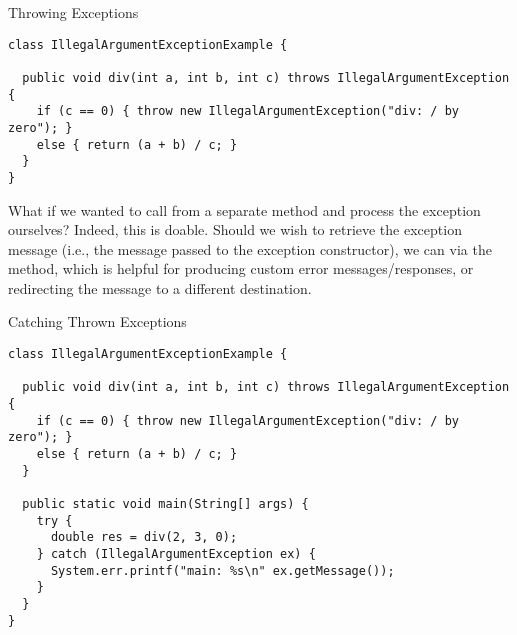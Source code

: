\begin{cl}{Throwing Exceptions} 
\begin{lstlisting}[language=MyJava]
class IllegalArgumentExceptionExample {
  
  public void div(int a, int b, int c) throws IllegalArgumentException {
    if (c == 0) { throw new IllegalArgumentException("div: / by zero"); }
    else { return (a + b) / c; }
  }
}
\end{lstlisting}
\end{cl}

What if we wanted to call  from a separate method and process the exception ourselves? Indeed, this is doable. Should we wish to retrieve the exception message (i.e., the message passed to the exception constructor), we can via the  method, which is helpful for producing custom error messages/responses, or redirecting the message to a different destination.

\begin{cl}{Catching Thrown Exceptions}
\begin{lstlisting}[language=MyJava]
class IllegalArgumentExceptionExample {
  
  public void div(int a, int b, int c) throws IllegalArgumentException {
    if (c == 0) { throw new IllegalArgumentException("div: / by zero"); }
    else { return (a + b) / c; }
  }

  public static void main(String[] args) {
    try {
      double res = div(2, 3, 0);
    } catch (IllegalArgumentException ex) {
      System.err.printf("main: %s\n" ex.getMessage());
    }
  }
}
\end{lstlisting}
\end{cl}


